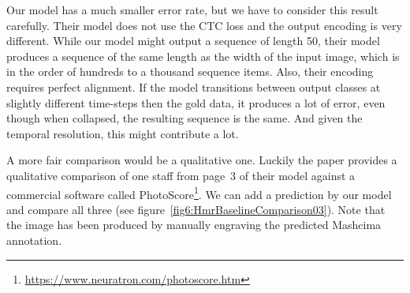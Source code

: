 Our model has a much smaller error rate, but we have to consider this result carefully. Their model does not use the CTC loss and the output encoding is very different. While our model might output a sequence of length 50, their model produces a sequence of the same length as the width of the input image, which is in the order of hundreds to a thousand sequence items. Also, their encoding requires perfect alignment. If the model transitions between output classes at slightly different time-steps then the gold data, it produces a lot of error, even though when collapsed, the resulting sequence is the same. And given the temporal resolution, this might contribute a lot.

A more fair comparison would be a qualitative one. Luckily the paper provides a qualitative comparison of one staff from page~3 of their model against a commercial software called PhotoScore\footnote{\href{https://www.neuratron.com/photoscore.htm}{https://www.neuratron.com/photoscore.htm}}. We can add a prediction by our model and compare all three (see figure~\ref{fig6:HmrBaselineComparison03}). Note that the image has been produced by manually engraving the predicted Mashcima annotation.

